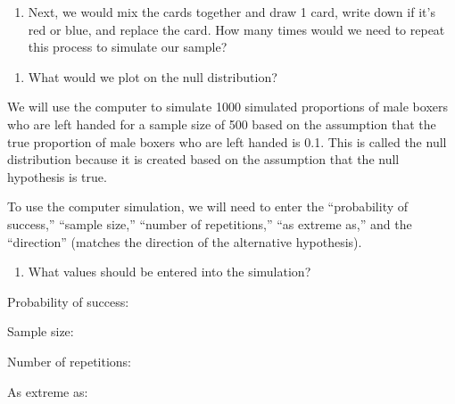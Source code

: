 \documentclass[
]{report}
\providecommand{\tightlist}{%
  \setlength{\itemsep}{0pt}\setlength{\parskip}{0pt}}
\begin{document}
\vspace{0.5in}

\begin{enumerate}
\def\labelenumi{\arabic{enumi}.}
\setcounter{enumi}{15}
\tightlist
\item
  Next, we would mix the cards together and draw 1 card, write down if it's red or blue, and replace the card. How many times would we need to repeat this process to simulate our sample?
\end{enumerate}

\vspace{0.5in}

\begin{enumerate}
\def\labelenumi{\arabic{enumi}.}
\setcounter{enumi}{16}
\tightlist
\item
  What would we plot on the null distribution?
  \vspace{1in}
\end{enumerate}

We will use the computer to simulate 1000 simulated proportions of male boxers who are left handed for a sample size of 500 based on the assumption that the true proportion of male boxers who are left handed is 0.1. This is called the null distribution because it is created based on the assumption that the null hypothesis is true.

To use the computer simulation, we will need to enter the ``probability of success,'' ``sample size,'' ``number of repetitions,'' ``as extreme as,'' and the ``direction'' (matches the direction of the alternative hypothesis).

\begin{enumerate}
\def\labelenumi{\arabic{enumi}.}
\setcounter{enumi}{17}
\tightlist
\item
  What values should be entered into the simulation?
\end{enumerate}

\vspace{0.25in}

Probability of success:

\vspace{0.25in}

Sample size:

\vspace{0.25in}

Number of repetitions:

\vspace{0.25in}

As extreme as:
\end{document}
